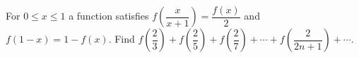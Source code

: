 For $0\le x\le1$ a function satisfies $f\left(\dfrac x{x+1}\right)=\dfrac{f(x)}2$ and $f(1-x)=1-f(x)$. Find $f\left(\dfrac23\right)+f\left(\dfrac25\right)+f\left(\dfrac27\right)+\cdots+f\left(\dfrac2{2n+1}\right)+\cdots$.
